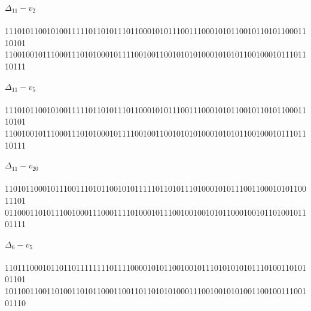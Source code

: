 \documentclass[
]{article}
\begin{document}
\noindent

\begin{minipage}{\linewidth}
\textbf{$\Delta_{11} - v_{2}$}\\[2pt]
{\small{}\\
11101011001010011111011010111011000101011100111000101011001011010110001110101\\
11001001011100011101010001011110010011001010101000101010110010001011101110111}
\end{minipage}
\medskip

\noindent

\begin{minipage}{\linewidth}
\textbf{$\Delta_{11} - v_{5}$}\\[2pt]
{\small{}\\
11101011001010011111011010111011000101011100111000101011001011010110001110101\\
11001001011100011101010001011110010011001010101000101010110010001011101110111}
\end{minipage}
\medskip

\noindent

\begin{minipage}{\linewidth}
\textbf{$\Delta_{11} - v_{20}$}\\[2pt]
{\small{}\\
11010110001011100111010110010101111101101011101000101011100110001010110011101\\
01100011010111001000111000111101000101110010010010101100010010110100101101111}
\end{minipage}
\medskip

\noindent

\begin{minipage}{\linewidth}
\textbf{$\Delta_6 - v_{5}$}\\[2pt]
{\small{}\\
11011100010110110111111110111100001010110010010111010101010111010011010101101\\
10110011001101001101011000110011011010101000111001001010100110010011100101110}
\end{minipage}
\medskip
\end{document}
